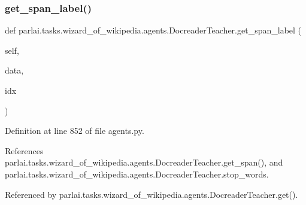 \subsubsection{\texorpdfstring{get\+\_\+span\+\_\+label()}{get\_span\_label()}}
{\footnotesize\ttfamily def parlai.\+tasks.\+wizard\+\_\+of\+\_\+wikipedia.\+agents.\+Docreader\+Teacher.\+get\+\_\+span\+\_\+label (\begin{DoxyParamCaption}\item[{}]{self,  }\item[{}]{data,  }\item[{}]{idx }\end{DoxyParamCaption})}



Definition at line 852 of file agents.\+py.



References parlai.\+tasks.\+wizard\+\_\+of\+\_\+wikipedia.\+agents.\+Docreader\+Teacher.\+get\+\_\+span(), and parlai.\+tasks.\+wizard\+\_\+of\+\_\+wikipedia.\+agents.\+Docreader\+Teacher.\+stop\+\_\+words.



Referenced by parlai.\+tasks.\+wizard\+\_\+of\+\_\+wikipedia.\+agents.\+Docreader\+Teacher.\+get().

